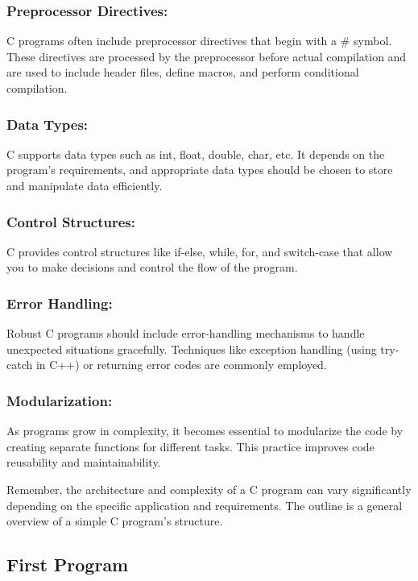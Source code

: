 \subsubsection{Preprocessor Directives:}
C programs often include preprocessor directives that begin with a \# symbol. These directives are processed by the preprocessor before actual compilation and are used to include header files, define macros, and perform conditional compilation.

\subsubsection{Data Types:}
C supports data types such as int, float, double, char, etc. It depends on the program's requirements, and appropriate data types should be chosen to store and manipulate data efficiently.

\subsubsection{Control Structures:}
C provides control structures like if-else, while, for, and switch-case that allow you to make decisions and control the flow of the program.

\subsubsection{Error Handling:}
Robust C programs should include error-handling mechanisms to handle unexpected situations gracefully. Techniques like exception handling (using try-catch in C++) or returning error codes are commonly employed.

\subsubsection{Modularization:}
As programs grow in complexity, it becomes essential to modularize the code by creating separate functions for different tasks. This practice improves code reusability and maintainability.

Remember, the architecture and complexity of a C program can vary significantly depending on the specific application and requirements. The outline is a general overview of a simple C program's structure.


\subsection{First Program}

